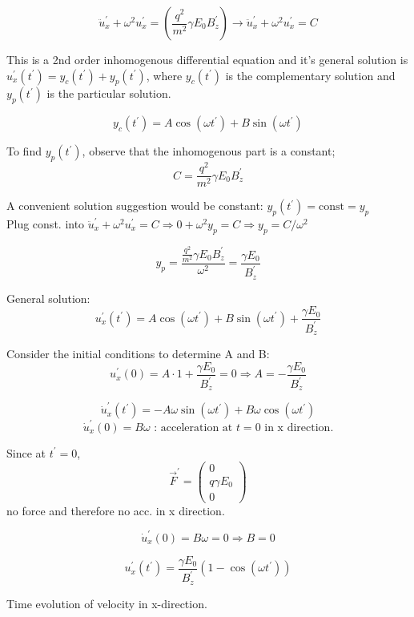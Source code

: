 \documentclass[12pt]{article}
\begin{document}
\begin{enumerate}
\[
\ddot{u}_x^{\prime} + \omega^2 u_x^{\prime} = \left( \frac{q^2}{m^2} \gamma E_0 B_z^{\prime} \right) \rightarrow \ddot{u}_x^{\prime} + \omega^2 u_x^{\prime} = C
\]

This is a 2nd order inhomogenous differential equation and it's general solution is$u_x^{\prime}(t^{\prime}) = y_c(t^{\prime}) + y_p(t^{\prime})$, where $y_c(t^{\prime})$ is the complementary solution and $y_p(t^{\prime})$ is the particular solution.

\[
y_c(t^{\prime}) = A \cos(\omega t^{\prime}) + B \sin(\omega t^{\prime})
\]


To find $y_p(t^{\prime})$, observe that the inhomogenous part is a constant;
\[
C = \frac{q^2}{m^2} \gamma E_0 B_z^{\prime}
\]

A convenient solution suggestion would be constant: $y_p(t^{\prime}) = \text{const} = y_p$\\

\noindent Plug const. into $\ddot{u}_x^{\prime} + \omega^2 u_x^{\prime} = C \Rightarrow 0 + \omega^2 y_p = C \Rightarrow y_p = C/\omega^2$

\[
y_p = \frac{\frac{q^2}{m^2} \gamma E_0 B_z^{\prime}}{\omega^2} = \frac{\gamma E_0}{B_z^{\prime}}
\]

\noindent General solution:
\[
u_x^{\prime}(t^{\prime}) = A \cos(\omega t^{\prime}) + B \sin(\omega t^{\prime}) + \frac{\gamma E_0}{B_z^{\prime}}
\]

Consider the initial conditions to determine A and B:
\[
u_x^{\prime}(0) = A \cdot 1 + \frac{\gamma E_0}{B_z^{\prime}} = 0 \Rightarrow A = -\frac{\gamma E_0}{B_z^{\prime}}
\]

\[
\dot{u}_x^{\prime}(t^{\prime}) = -A \omega \sin(\omega t^{\prime}) + B \omega \cos(\omega t^{\prime})
\]
\[
\dot{u}_x^{\prime}(0) = B \omega \text{ : acceleration at } t=0 \text{ in x direction.}
\]

Since at $t^{\prime} = 0$,
\[
\vec{F}^{\prime} = \begin{pmatrix} 0 \\ q \gamma E_0 \\ 0 \end{pmatrix}
\]
no force and therefore no acc. in x direction.

\[
\dot{u}_x^{\prime}(0) = B \omega = 0 \Rightarrow B = 0
\]

\[
u_x^{\prime}(t^{\prime}) = \frac{\gamma E_0}{B_z^{\prime}} (1 - \cos(\omega t^{\prime}))
\]

\noindent Time evolution of velocity in x-direction.


\end{enumerate}
\end{document}
